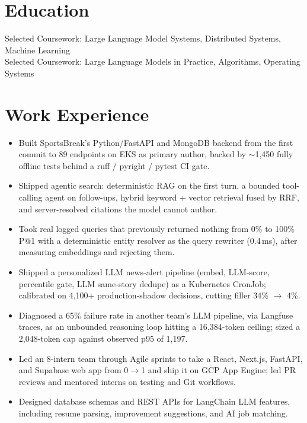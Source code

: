 \documentclass[11pt, letterpaper]{article}
\begin{document}

\section{Education}
Selected Coursework: Large Language Model Systems, Distributed Systems, Machine Learning\\[1pt]
Selected Coursework: Large Language Models in Practice, Algorithms, Operating Systems

\section{Work Experience}
\begin{itemize}
  \item Built SportsBreak's Python/FastAPI and MongoDB backend from the first commit to 89 endpoints on EKS as primary author, backed by $\sim$1{,}450 fully offline tests behind a ruff / pyright / pytest CI gate.
  \item Shipped agentic search: deterministic RAG on the first turn, a bounded tool-calling agent on follow-ups, hybrid keyword + vector retrieval fused by RRF, and server-resolved citations the model cannot author.
  \item Took real logged queries that previously returned nothing from 0\% to 100\% P@1 with a deterministic entity resolver as the query rewriter (0.4\,ms), after measuring embeddings and rejecting them.
  \item Shipped a personalized LLM news-alert pipeline (embed, LLM-score, percentile gate, LLM same-story dedupe) as a Kubernetes CronJob; calibrated on 4{,}100+ production-shadow decisions, cutting filler 34\% $\rightarrow$ 4\%.
  \item Diagnosed a 65\% failure rate in another team's LLM pipeline, via Langfuse traces, as an unbounded reasoning loop hitting a 16{,}384-token ceiling; sized a 2{,}048-token cap against observed p95 of 1{,}197.
\end{itemize}

\begin{itemize}
  \item Led an 8-intern team through Agile sprints to take a React, Next.js, FastAPI, and Supabase web app from 0$\rightarrow$1 and ship it on GCP App Engine; led PR reviews and mentored interns on testing and Git workflows.
  \item Designed database schemas and REST APIs for LangChain LLM features, including resume parsing, improvement suggestions, and AI job matching.
\end{itemize}
\end{document}
